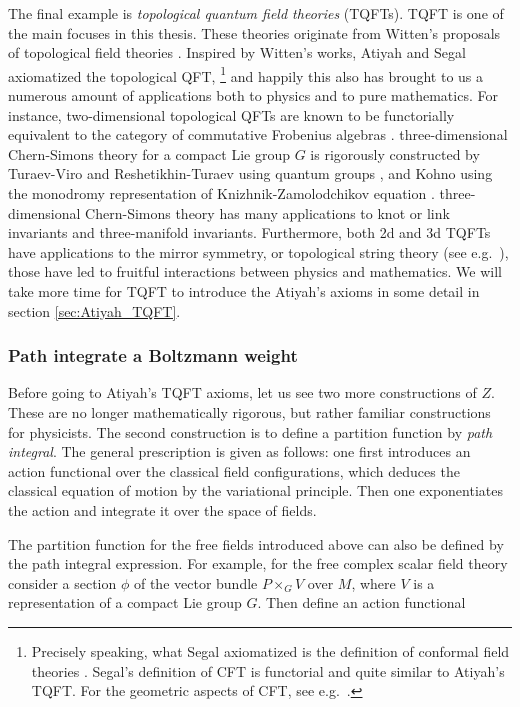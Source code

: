The final example is \emph{topological quantum field theories} (TQFTs).
TQFT is one of the main focuses in this thesis. These theories
originate from Witten's proposals of topological field theories
\cite{Witten:1988xj, Witten:1988ze, Witten:1988hf}. Inspired by Witten's
works, Atiyah and Segal axiomatized the topological QFT,%
%
\footnote{Precisely speaking, what Segal axiomatized is the definition of conformal
field theories \cite{Segal:2002ei}. Segal's definition of CFT is functorial
and quite similar to Atiyah's TQFT.
For the geometric aspects of CFT, see e.g.~\cite{Friedan:1986ua}. }
%
and happily this also has brought to us a numerous amount of applications
both to physics and to pure mathematics. For instance, two-dimensional
topological QFTs are known to be functorially equivalent to the category of commutative
Frobenius algebras \cite{MR2037238}. three-dimensional Chern-Simons theory for a
compact Lie group $G$ is rigorously constructed by
Turaev-Viro and Reshetikhin-Turaev using quantum groups \cite{Turaev:1992hq, Reshetikhin:1991tc},
and Kohno \cite{MR1167165} using
the monodromy representation of Knizhnik-Zamolodchikov equation \cite{Knizhnik:1984nr}.
three-dimensional Chern-Simons theory has many
applications to knot or link invariants and three-manifold invariants.
Furthermore, both 2d and 3d TQFTs have applications to the mirror symmetry,
or topological string theory (see e.g.~\cite{Hori:2003ic}), those have led to fruitful interactions
between physics and mathematics. We will take more time for TQFT to
introduce the Atiyah's axioms in some detail in section \ref{sec:Atiyah_TQFT}.





\subsubsection*{Path integrate a Boltzmann weight}

Before going to Atiyah's TQFT axioms, let us see two more constructions
of $Z$. These are no longer mathematically rigorous, but rather familiar
constructions for physicists. The second construction is to define
a partition function by \emph{path integral}. The general prescription
is given as follows: one first introduces an action functional over
the classical field configurations, which deduces the classical equation
of motion by the variational principle. Then one exponentiates the
action and integrate it over the space of fields.

The partition function for the free fields introduced above can also be
defined by the path integral expression. For example, for the free
complex scalar field theory consider a section $\phi$ of the vector
bundle $P\times_{G}V$ over $M$, where $V$ is a representation of
a compact Lie group $G$. Then define an action functional

